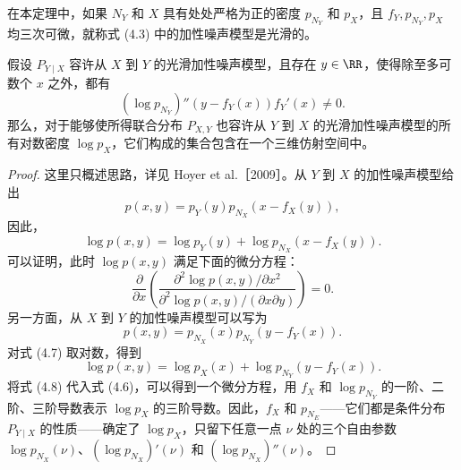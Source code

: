 \begin{theorem}[加性噪声模型的可识别性]
在本定理中，如果 $N_Y$ 和 $X$ 具有处处严格为正的密度 $p_{N_Y}$ 和 $p_X$，且 $f_Y,p_{N_Y},p_X$ 均三次可微，就称式 (4.3) 中的加性噪声模型是光滑的。

假设 $P_{Y\mid X}$ 容许从 $X$ 到 $Y$ 的光滑加性噪声模型，且存在 $y\in\RR$，使得除至多可数个 $x$ 之外，都有
\begin{equation}
 (\log p_{N_Y})''(y-f_Y(x))f_Y'(x)\neq0.
 \tag{4.4}
\end{equation}
那么，对于能够使所得联合分布 $P_{X,Y}$ 也容许从 $Y$ 到 $X$ 的光滑加性噪声模型的所有对数密度 $\log p_X$，它们构成的集合包含在一个三维仿射空间中。
\end{theorem}
\begin{proof}
这里只概述思路，详见 Hoyer et al.［2009］。从 $Y$ 到 $X$ 的加性噪声模型给出
\begin{equation}
 p(x,y)=p_Y(y)p_{N_X}(x-f_X(y)),
 \tag{4.5}
\end{equation}
因此，
\[
 \log p(x,y)=\log p_Y(y)+\log p_{N_X}(x-f_X(y)).
\]
可以证明，此时 $\log p(x,y)$ 满足下面的微分方程：
\begin{equation}
 \frac{\partial}{\partial x}
 \left(
 \frac{\partial^2\log p(x,y)/\partial x^2}
      {\partial^2\log p(x,y)/(\partial x\partial y)}
 \right)=0.
 \tag{4.6}
\end{equation}
另一方面，从 $X$ 到 $Y$ 的加性噪声模型可以写为
\begin{equation}
 p(x,y)=p_{N_X}(x)p_{N_Y}(y-f_Y(x)).
 \tag{4.7}
\end{equation}
对式 (4.7) 取对数，得到
\begin{equation}
 \log p(x,y)=\log p_X(x)+\log p_{N_Y}(y-f_Y(x)).
 \tag{4.8}
\end{equation}
将式 (4.8) 代入式 (4.6)，可以得到一个微分方程，用 $f_X$ 和 $\log p_{N_Y}$ 的一阶、二阶、三阶导数表示 $\log p_X$ 的三阶导数。因此，$f_X$ 和 $p_{N_E}$——它们都是条件分布 $P_{Y\mid X}$ 的性质——确定了 $\log p_X$，只留下任意一点 $\nu$ 处的三个自由参数 $\log p_{N_X}(\nu)$、$(\log p_{N_X})'(\nu)$ 和 $(\log p_{N_X})''(\nu)$。
\end{proof}

